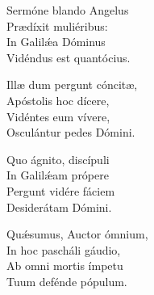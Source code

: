 Sermóne blando Angelus\\  
Prædíxit muliéribus:\\  
In Galilǽa Dóminus\\  
Vidéndus est quantócius.

Illæ dum pergunt cóncitæ,\\  
Apóstolis hoc dícere,\\  
Vidéntes eum vívere,\\  
Osculántur pedes Dómini.

Quo ágnito, discípuli\\  
In Galilǽam própere\\  
Pergunt vidére fáciem\\  
Desiderátam Dómini.

Quǽsumus, Auctor ómnium,\\  
In hoc pascháli gáudio,\\  
Ab omni mortis ímpetu\\  
Tuum defénde pópulum.

